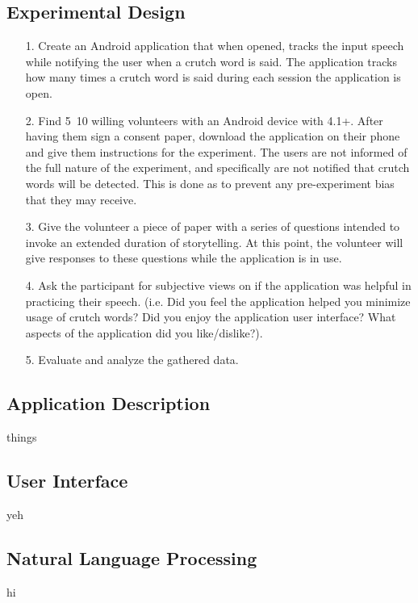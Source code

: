 \documentclass{sigchi}
\begin{document}
\subsection{Experimental Design}
\begin{itemize}
\item[1.] Create an Android application that when opened, tracks the input speech while notifying the user when a crutch word is said. The application tracks how many times a crutch word is said during each session the application is open.
\item[2.] Find 5~10 willing volunteers with an Android device with 4.1+. After having them sign a consent paper, download the application on their phone and give them instructions for the experiment. The users are not informed of the full nature of the experiment, and specifically are not notified that crutch words will be detected. This is done as to prevent any pre-experiment bias that they may receive.
\item[3.] Give the volunteer a piece of paper with a series of questions intended to invoke an extended duration of storytelling. At this point, the volunteer will give responses to these questions while the application is in use.
\item[4.] Ask the participant for subjective views on if the application was helpful in practicing their speech. (i.e. Did you feel the application helped you minimize usage of crutch words? Did you enjoy the application user interface? What aspects of the application did you like/dislike?).
\item[5.] Evaluate and analyze the gathered data. 
\end{itemize}

\subsection{Application Description}

things

\subsection{User Interface}

yeh

\subsection{Natural Language Processing}

hi
\end{document}
